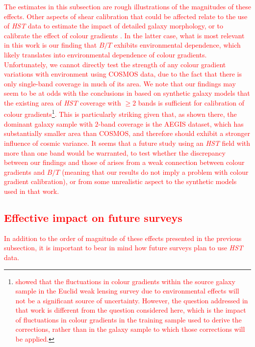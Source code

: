 \documentclass[twocolumn,useAMS,usenatbib]{mn2e}
\newcommand{\rachel}[1]{{\textcolor{red}{#1}}}
\begin{document}
\rachel{The estimates in this subsection are rough illustrations of
  the magnitudes of these effects.  Other aspects of shear calibration
  that could be affected relate to the use of {\em HST} data to
  estimate the impact of detailed galaxy morphology, or to calibrate
  the effect of colour gradients
  \citep{2012MNRAS.421.1385V,2013MNRAS.432.2385S}.  In the latter
  case, what is most relevant in this work is our finding that $B/T$
  exhibits environmental dependence, which likely translates into
  environmental dependence of colour gradients.  Unfortunately, we
  cannot directly test the strength of any colour gradient variations
  with environment using COSMOS data, due to the fact that there is
  only single-band coverage in much of its area.  We note that our
  findings may seem to be at odds with the conclusions in
  \cite{2013MNRAS.432.2385S} based on synthetic galaxy models that the
  existing area of {\em HST} coverage with $\ge 2$ bands is sufficient
  for calibration of colour
  gradients\footnote{\rachel{\cite{2012MNRAS.421.1385V} showed that the
    fluctuations in colour gradients within the source galaxy sample
    in the Euclid weak lensing survey due to environmental effects
    will not be a significant source of uncertainty.  However, the
    question addressed in that work is different from the question
    considered here, which is the impact of fluctuations in colour
    gradients in the training sample used to derive the corrections,
    rather than in the galaxy sample to which those corrections will
    be applied.}}.  This is particularly striking given that, as shown
  there, the dominant galaxy sample with $2$-band coverage is the
  AEGIS dataset, which has substantially smaller area than COSMOS, and
  therefore should exhibit a stronger influence of cosmic variance.  It seems that a future study using
  an {\em HST} field with more than one band would be warranted, to
  test whether the discrepancy between our findings and those of
  \cite{2013MNRAS.432.2385S} arises from a weak connection between
  colour gradients and $B/T$ (meaning that our results do not imply a
  problem with colour gradient calibration), or from some unrealistic
  aspect to the synthetic models used in that work.}

\subsection{\rachel{Effective impact on future surveys}}

\rachel{In addition to the order of magnitude of these effects
  presented in the previous subsection, it is important to bear in
  mind how future surveys plan to use {\em HST} data.}
\end{document}
